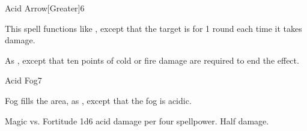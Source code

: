 \begin{spellsection}{Acid Arrow}[Greater]{6}
    \begin{spellheader}
    \end{spellheader}
    \begin{spellcontent}
        \spellspecial This spell functions like , except that the target is \staggered for 1 round each time it takes damage.
    \end{spellcontent}
    \begin{spellfooter}
        \spellnotes As , except that ten points of cold or fire damage are required to end the effect.
        \miscastrandom
    \end{spellfooter}
\end{spellsection}

\begin{spellsection}{Acid Fog}{7}
    \begin{spellheader}
    \end{spellheader}
    \begin{spellcontent}
        \begin{spelltargetinginfo}
        \end{spelltargetinginfo}
        \begin{spelleffects}
            \spelleffect Fog fills the area, as , except that the fog is acidic.
            \spelldur \durshort
        \end{spelleffects}
    \end{spellcontent}
    \begin{spellsubcontent}
        \begin{spelltargetinginfo}
        \end{spelltargetinginfo}
        \begin{spelleffects}
            \begin{spellattack}{Magic vs. Fortitude}
                \spellsuccess 1d6 acid damage per four spellpower.
                \spellfailure Half damage.
            \end{spellattack}
        \end{spelleffects}
    \end{spellsubcontent}
    \begin{spellfooter}
        \spellnotes \physicalspellnotes
        \miscastyou
    \end{spellfooter}
\end{spellsection}

